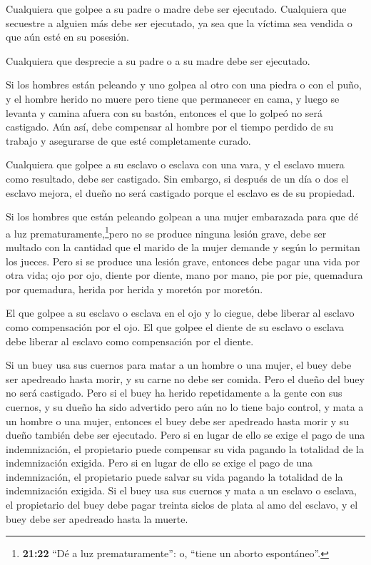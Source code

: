  Cualquiera que golpee a su padre o madre debe ser
ejecutado.  Cualquiera que secuestre a alguien más debe ser
ejecutado, ya sea que la víctima sea vendida o que aún esté en su
posesión.

 Cualquiera que desprecie a su padre o a su madre debe ser
ejecutado.

 Si los hombres están peleando y uno golpea al otro con una
piedra o con el puño, y el hombre herido no muere pero tiene que
permanecer en cama,  y luego se levanta y camina afuera con
su bastón, entonces el que lo golpeó no será castigado. Aún así, debe
compensar al hombre por el tiempo perdido de su trabajo y asegurarse de
que esté completamente curado.

 Cualquiera que golpee a su esclavo o esclava con una vara,
y el esclavo muera como resultado, debe ser castigado.  Sin
embargo, si después de un día o dos el esclavo mejora, el dueño no será
castigado porque el esclavo es de su propiedad.

 Si los hombres que están peleando golpean a una mujer
embarazada para que dé a luz prematuramente,\footnote{\textbf{21:22}
  ``Dé a luz prematuramente'': o, ``tiene un aborto espontáneo''.}pero
no se produce ninguna lesión grave, debe ser multado con la cantidad que
el marido de la mujer demande y según lo permitan los jueces.
 Pero si se produce una lesión grave, entonces debe pagar
una vida por otra vida;  ojo por ojo, diente por diente,
mano por mano, pie por pie,  quemadura por quemadura,
herida por herida y moretón por moretón.

 El que golpee a su esclavo o esclava en el ojo y lo
ciegue, debe liberar al esclavo como compensación por el ojo.
 El que golpee el diente de su esclavo o esclava debe
liberar al esclavo como compensación por el diente.

 Si un buey usa sus cuernos para matar a un hombre o una
mujer, el buey debe ser apedreado hasta morir, y su carne no debe ser
comida. Pero el dueño del buey no será castigado.  Pero si
el buey ha herido repetidamente a la gente con sus cuernos, y su dueño
ha sido advertido pero aún no lo tiene bajo control, y mata a un hombre
o una mujer, entonces el buey debe ser apedreado hasta morir y su dueño
también debe ser ejecutado.  Pero si en lugar de ello se
exige el pago de una indemnización, el propietario puede compensar su
vida pagando la totalidad de la indemnización exigida. 
Pero si en lugar de ello se exige el pago de una indemnización, el
propietario puede salvar su vida pagando la totalidad de la
indemnización exigida.  Si el buey usa sus cuernos y mata a
un esclavo o esclava, el propietario del buey debe pagar treinta siclos
de plata al amo del esclavo, y el buey debe ser apedreado hasta la
muerte.

